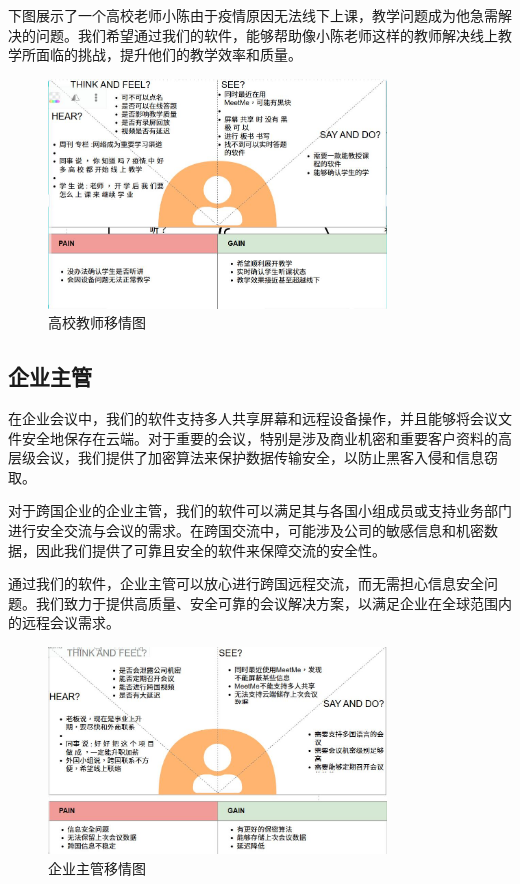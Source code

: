 \documentclass[a4paper,12pt]{article}
\begin{document}
下图展示了一个高校老师小陈由于疫情原因无法线下上课，教学问题成为他急需解决的问题。我们希望通过我们的软件，能够帮助像小陈老师这样的教师解决线上教学所面临的挑战，提升他们的教学效率和质量。
\begin{figure}[h]
    \centering
    \includegraphics[width=0.8\textwidth]{高校移情图.jpg}
    \caption{高校教师移情图}
\end{figure}
\clearpage


\subsection{企业主管}
在企业会议中，我们的软件支持多人共享屏幕和远程设备操作，并且能够将会议文件安全地保存在云端。对于重要的会议，特别是涉及商业机密和重要客户资料的高层级会议，我们提供了加密算法来保护数据传输安全，以防止黑客入侵和信息窃取。

对于跨国企业的企业主管，我们的软件可以满足其与各国小组成员或支持业务部门进行安全交流与会议的需求。在跨国交流中，可能涉及公司的敏感信息和机密数据，因此我们提供了可靠且安全的软件来保障交流的安全性。

通过我们的软件，企业主管可以放心进行跨国远程交流，而无需担心信息安全问题。我们致力于提供高质量、安全可靠的会议解决方案，以满足企业在全球范围内的远程会议需求。
\begin{figure}[h]
    \centering
    \includegraphics[width=0.8\textwidth]{企业移情图.jpg}
    \caption{企业主管移情图}
\end{figure}
\clearpage
\end{document}
